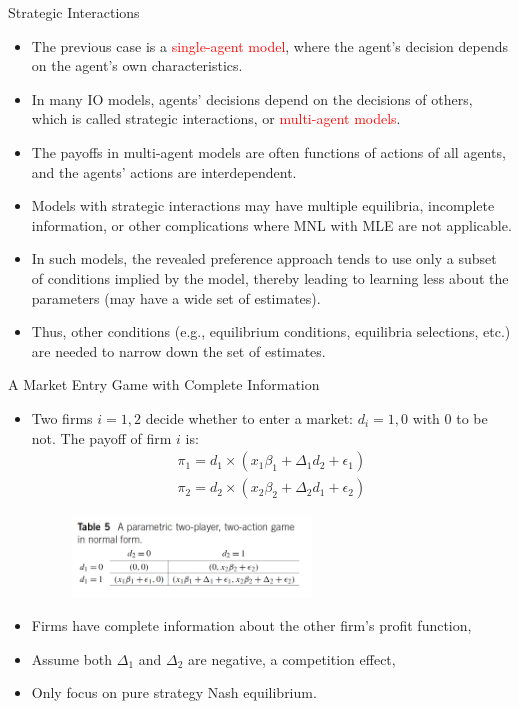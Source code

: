 \documentclass[aspectratio=169]{beamer}  %
\begin{document}
\begin{frame}{Strategic Interactions}
    \begin{itemize}
        \item The previous case is a \textcolor{red}{single-agent model}, where the agent's decision depends on the agent's own characteristics.
        \item In many IO models, agents' decisions depend on the decisions of others, which is called strategic interactions, or \textcolor{red}{multi-agent models}.
        \item The payoffs in multi-agent models are often functions of actions of all agents, and the agents' actions are interdependent.
        \item Models with strategic interactions may have multiple equilibria, incomplete information, or other complications where MNL with MLE are not applicable.
        \item In such models, the revealed preference approach tends to use only a subset of conditions implied by the model, thereby leading to learning less about the parameters (may have a wide set of estimates).
        \item Thus, other conditions (e.g., equilibrium conditions, equilibria selections, etc.) are needed to narrow down the set of estimates.
    \end{itemize}
\end{frame}

\begin{frame}{A Market Entry Game with Complete Information}
\begin{itemize}
    \item Two firms $i = 1, 2$ decide whether to enter a market: $d_i = {1,0}$ with $0$ to be not. The payoff of firm $i$ is:
    \begin{align*}
        \pi_1 = d_1 \times (x_1 \beta_1 + \Delta_1 d_2 + \epsilon_1) \\
        \pi_2 = d_2 \times (x_2 \beta_2 + \Delta_2 d_1 + \epsilon_2)
    \end{align*}

\begin{figure}
    \centering
    \includegraphics[width=0.6\textwidth]{market entry game table.png}
\end{figure}

    \item Firms have complete information about the other firm's profit function,
    \item Assume both $\Delta_1$ and $\Delta_2$ are negative, a competition effect,
    \item Only focus on pure strategy Nash equilibrium.
    \end{itemize}
\end{frame}
\end{document}
